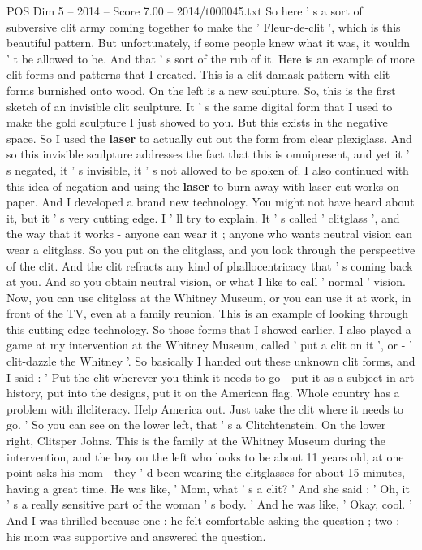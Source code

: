 \begin{textsample}{POS Dim 5 – 2014 – Score 7.00 – 2014/t000045.txt}
So here ' s a sort of subversive clit army coming together to make the ' Fleur-de-clit ', which is this beautiful pattern.
But unfortunately, if some people knew what it was, it wouldn ' t be allowed to be.
And that ' s sort of the rub of it.
Here is an example of more clit forms and patterns that I created.
This is a clit damask pattern with clit forms burnished onto wood.
On the left is a new sculpture.
So, this is the first sketch of an invisible clit sculpture.
It ' s the same digital form that I used to make the gold sculpture I just showed to you.
But this exists in the negative space.
So I used the \textbf{laser} to actually cut out the form from clear plexiglass.
And so this invisible sculpture addresses the fact that this is omnipresent, and yet it ' s negated, it ' s invisible, it ' s not allowed to be spoken of.
I also continued with this idea of negation and using the \textbf{laser} to burn away with laser-cut works on paper.
And I developed a brand new technology.
You might not have heard about it, but it ' s very cutting edge.
I ' ll try to explain.
It ' s called ' clitglass ', and the way that it works - anyone can wear it ; anyone who wants neutral vision can wear a clitglass.
So you put on the clitglass, and you look through the perspective of the clit.
And the clit refracts any kind of phallocentricacy that ' s coming back at you.
And so you obtain neutral vision, or what I like to call ' normal ' vision.
Now, you can use clitglass at the Whitney Museum, or you can use it at work, in front of the TV, even at a family reunion.
This is an example of looking through this cutting edge technology.
So those forms that I showed earlier, I also played a game at my intervention at the Whitney Museum, called ' put a clit on it ', or - ' clit-dazzle the Whitney '.
So basically I handed out these unknown clit forms, and I said : ' Put the clit wherever you think it needs to go - put it as a subject in art history, put into the designs, put it on the American flag.
Whole country has a problem with illcliteracy.
Help America out.
Just take the clit where it needs to go. ' So you can see on the lower left, that ' s a Clitchtenstein.
On the lower right, Clitsper Johns.
This is the family at the Whitney Museum during the intervention, and the boy on the left who looks to be about 11 years old, at one point asks his mom - they ' d been wearing the clitglasses for about 15 minutes, having a great time.
He was like, ' Mom, what ' s a clit? ' And she said : ' Oh, it ' s a really sensitive part of the woman ' s body. ' And he was like, ' Okay, cool. ' And I was thrilled because one : he felt comfortable asking the question ; two : his mom was supportive and answered the question.

\end{textsample}
